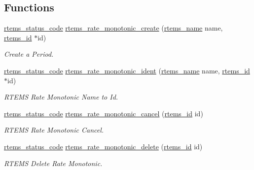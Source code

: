 \subsection*{Functions}
\begin{DoxyCompactItemize}
\item 
\mbox{\hyperlink{group__ClassicStatus_ga545d41846817eaba6143d52ee4d9e9fe}{rtems\+\_\+status\+\_\+code}} \mbox{\hyperlink{group__ClassicRateMon_gab599ee7e8f65f1d1461a3a5e198491eb}{rtems\+\_\+rate\+\_\+monotonic\+\_\+create}} (\mbox{\hyperlink{group__ClassicTasks_ga55fb63c49f68c0cbd9bee004da15b1fd}{rtems\+\_\+name}} name, \mbox{\hyperlink{group__ClassicTasks_gab20892b814dced7dd4e5b9bf42becd57}{rtems\+\_\+id}} $\ast$id)
\begin{DoxyCompactList}\small\item\em Create a Period. \end{DoxyCompactList}\item 
\mbox{\hyperlink{group__ClassicStatus_ga545d41846817eaba6143d52ee4d9e9fe}{rtems\+\_\+status\+\_\+code}} \mbox{\hyperlink{group__ClassicRateMon_ga84840acb8f43fd0c19c00236e17737d8}{rtems\+\_\+rate\+\_\+monotonic\+\_\+ident}} (\mbox{\hyperlink{group__ClassicTasks_ga55fb63c49f68c0cbd9bee004da15b1fd}{rtems\+\_\+name}} name, \mbox{\hyperlink{group__ClassicTasks_gab20892b814dced7dd4e5b9bf42becd57}{rtems\+\_\+id}} $\ast$id)
\begin{DoxyCompactList}\small\item\em R\+T\+E\+MS Rate Monotonic Name to Id. \end{DoxyCompactList}\item 
\mbox{\hyperlink{group__ClassicStatus_ga545d41846817eaba6143d52ee4d9e9fe}{rtems\+\_\+status\+\_\+code}} \mbox{\hyperlink{group__ClassicRateMon_ga4313840d58c7a2ccc4b1e6151e712bf7}{rtems\+\_\+rate\+\_\+monotonic\+\_\+cancel}} (\mbox{\hyperlink{group__ClassicTasks_gab20892b814dced7dd4e5b9bf42becd57}{rtems\+\_\+id}} id)
\begin{DoxyCompactList}\small\item\em R\+T\+E\+MS Rate Monotonic Cancel. \end{DoxyCompactList}\item 
\mbox{\hyperlink{group__ClassicStatus_ga545d41846817eaba6143d52ee4d9e9fe}{rtems\+\_\+status\+\_\+code}} \mbox{\hyperlink{group__ClassicRateMon_ga51fbaab06f60134917d571c6116396ea}{rtems\+\_\+rate\+\_\+monotonic\+\_\+delete}} (\mbox{\hyperlink{group__ClassicTasks_gab20892b814dced7dd4e5b9bf42becd57}{rtems\+\_\+id}} id)
\begin{DoxyCompactList}\small\item\em R\+T\+E\+MS Delete Rate Monotonic. \end{DoxyCompactList}\item 

\end{DoxyCompactItemize}
